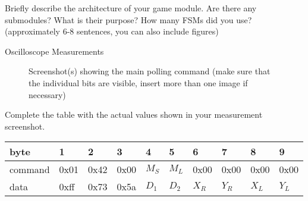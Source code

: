 \documentclass[10pt,a4paper,titlepage,oneside]{article}
\begin{document}
\maketitle



\begin{qa}{Briefly describe the architecture of your \textsf{game} module. Are there any submodules? What is their purpose? How many FSMs did you use? (approximately 6-8 sentences, you can also include figures)}

\end{qa}






\begin{qa}{Oscilloscope Measurements}
\begin{figure}[h!]
	\centering
	\dummyimage
	\caption{Screenshot(s) showing the main polling command (make sure that the individual bits are visible, insert more than one image if necessary)}
\end{figure}

\begin{center}

Complete the table with the actual values shown in your measurement screenshot.
\begin{center}
\ttfamily
\begin{tabular}{|l|l|l|l|l|l|l|l|l|l|}
\hline
byte    & 1    & 2    & 3    & 4     & 5     & 6     & 7     & 8     & 9    \\ \hline
command & 0x01 & 0x42 & 0x00 & $M_S$ & $M_L$ & 0x00  & 0x00  & 0x00  & 0x00 \\ \hline
data    & 0xff & 0x73 & 0x5a & $D_1$ & $D_2$ & $X_R$ & $Y_R$ & $X_L$ & $Y_L$ \\ \hline
\end{tabular}
\end{center}
\end{center}

\end{qa}
\end{document}

